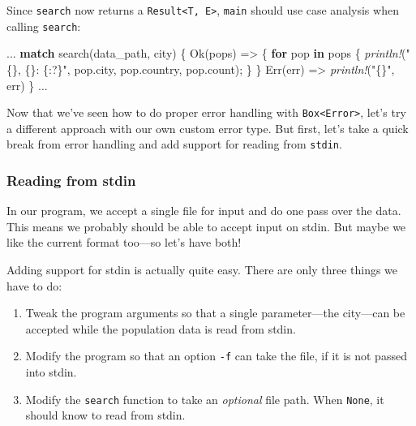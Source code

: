 \documentclass[a4paper,]{book}
\renewcommand*{\hypertarget}[3][\ar]{%
  \def\ar{#2}%
  \label{#1}%
  #3}
\newenvironment{Shaded}{\begin{snugshade}}{\end{snugshade}}
\newcommand{\KeywordTok}[1]{\textcolor[rgb]{0.13,0.29,0.53}{\textbf{{#1}}}}
\newcommand{\ConstantTok}[1]{\textcolor[rgb]{0.00,0.00,0.00}{{#1}}}
\newcommand{\StringTok}[1]{\textcolor[rgb]{0.31,0.60,0.02}{{#1}}}
\newcommand{\PreprocessorTok}[1]{\textcolor[rgb]{0.56,0.35,0.01}{\textit{{#1}}}}
\newcommand{\NormalTok}[1]{{#1}}
\providecommand{\tightlist}{%
  \setlength{\itemsep}{0pt}\setlength{\parskip}{0pt}}
\begin{document}
Since \texttt{search} now returns a
\texttt{Result\textless{}T,\ E\textgreater{}}, \texttt{main} should use
case analysis when calling \texttt{search}:

\begin{Shaded}
\begin{Highlighting}[]
\NormalTok{...}
    \KeywordTok{match} \NormalTok{search(data_path, city) \{}
        \ConstantTok{Ok}\NormalTok{(pops) => \{}
            \KeywordTok{for} \NormalTok{pop }\KeywordTok{in} \NormalTok{pops \{}
                \PreprocessorTok{println!}\NormalTok{(}\StringTok{"\{\}, \{\}: \{:?\}"}\NormalTok{, pop.city, pop.country, pop.count);}
            \NormalTok{\}}
        \NormalTok{\}}
        \ConstantTok{Err}\NormalTok{(err) => }\PreprocessorTok{println!}\NormalTok{(}\StringTok{"\{\}"}\NormalTok{, err)}
    \NormalTok{\}}
\NormalTok{...}
\end{Highlighting}
\end{Shaded}

Now that we've seen how to do proper error handling with
\texttt{Box\textless{}Error\textgreater{}}, let's try a different
approach with our own custom error type. But first, let's take a quick
break from error handling and add support for reading from
\texttt{stdin}.

\hypertarget{reading-from-stdin}{\subsubsection{Reading from
stdin}\label{reading-from-stdin}}

In our program, we accept a single file for input and do one pass over
the data. This means we probably should be able to accept input on
stdin. But maybe we like the current format too---so let's have both!

Adding support for stdin is actually quite easy. There are only three
things we have to do:

\begin{enumerate}
\def\labelenumi{\arabic{enumi}.}
\tightlist
\item
  Tweak the program arguments so that a single parameter---the
  city---can be accepted while the population data is read from stdin.
\item
  Modify the program so that an option \texttt{-f} can take the file, if
  it is not passed into stdin.
\item
  Modify the \texttt{search} function to take an \emph{optional} file
  path. When \texttt{None}, it should know to read from stdin.
\end{enumerate}
\end{document}
